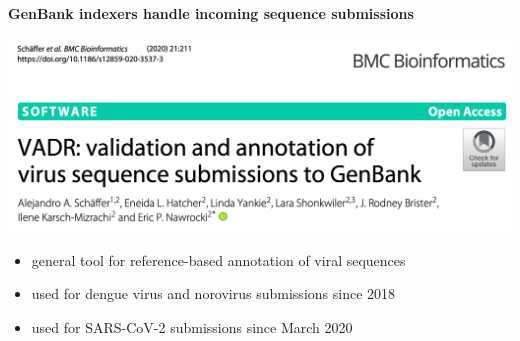 \documentclass[landscape]{slides}
\begin{document}
\begin{slide}
\begin{center}
\large{\textbf{GenBank indexers handle incoming sequence submissions}}
\end{center}


\vfill
\end{slide}
\begin{slide}
\begin{center}
\includegraphics[width=10in]{figs/vadr-title-paper}

\begin{itemize}
\item general tool for reference-based annotation of viral sequences
\item used for dengue virus and norovirus submissions since 2018
\item used for SARS-CoV-2 submissions since March 2020 
\end{itemize}

\vfill
\end{center}
\end{slide}
\end{document}
